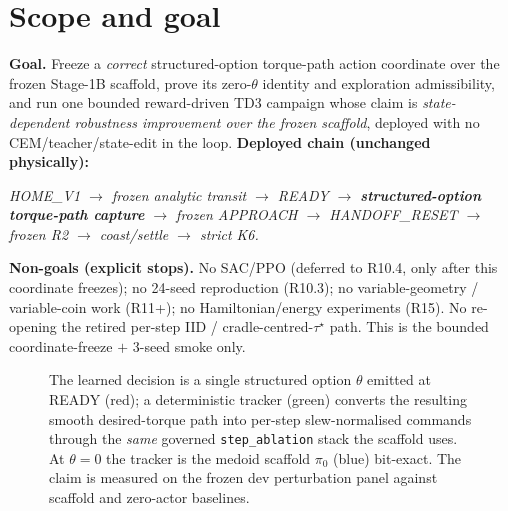 \documentclass[11pt]{article}
\newcommand{\code}[1]{\texttt{\small #1}}
\begin{document}
\section{Scope and goal}
\textbf{Goal.} Freeze a \emph{correct} structured-option torque-path action coordinate over the frozen Stage-1B scaffold,
prove its zero-$\theta$ identity and exploration admissibility, and run one bounded reward-driven TD3 campaign whose claim
is \emph{state-dependent robustness improvement over the frozen scaffold}, deployed with no CEM/teacher/state-edit in the
loop. \textbf{Deployed chain (unchanged physically):}
\begin{center}\itshape HOME\_V1 $\to$ frozen analytic transit $\to$ READY $\to$ \textbf{structured-option torque-path
capture} $\to$ frozen APPROACH $\to$ HANDOFF\_RESET $\to$ frozen R2 $\to$ coast/settle $\to$ strict K6.\end{center}
\textbf{Non-goals (explicit stops).} No SAC/PPO (deferred to R10.4, only after this coordinate freezes); no 24-seed
reproduction (R10.3); no variable-geometry / variable-coin work (R11+); no Hamiltonian/energy experiments (R15). No
re-opening the retired per-step IID / cradle-centred-$\tau^\star$ path. This is the bounded coordinate-freeze $+$ 3-seed
smoke only.

\begin{figure}[h]\centering\caption{The learned decision is a single structured option $\theta$ emitted
at READY (red); a deterministic tracker (green) converts the resulting smooth desired-torque path into per-step
slew-normalised commands through the \emph{same} governed \code{step\_ablation} stack the scaffold uses. At $\theta{=}0$ the
tracker is the medoid scaffold $\pi_0$ (blue) bit-exact. The claim is measured on the frozen dev perturbation panel against
scaffold and zero-actor baselines.}\end{figure}
\end{document}
